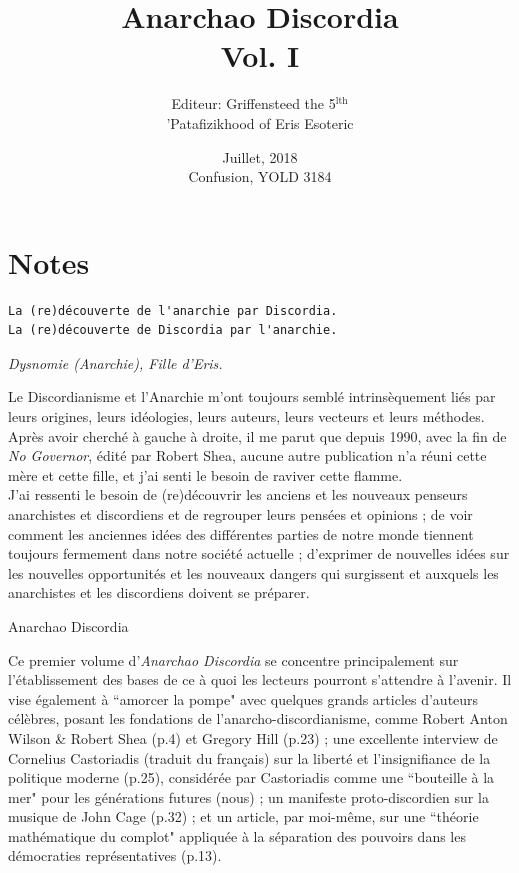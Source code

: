 \documentclass[12pt, onecolumn, letterpaper, oneside]{book}
\title{Anarchao Discordia\\
		\vspace{1\baselineskip}
		\large{Vol. I}
		}
\date{Juillet, 2018\\
		 Confusion, YOLD 3184}
\author{Editeur: Griffensteed the 5$^\text{lth}$\\
			'Patafizikhood of Eris Esoteric\\}
\begin{document}
\sloppy
 \renewcommand{\contentsname}{Sommaire}

\maketitle

\tableofcontents

\chapter*{Notes}
\begin{verbatim}
La (re)découverte de l'anarchie par Discordia.
La (re)découverte de Discordia par l'anarchie.        
\end{verbatim}

\begin{center}
\emph{Dysnomie (Anarchie), Fille d'Eris.}\\
\end{center}

Le Discordianisme et l'Anarchie m'ont toujours semblé intrinsèquement liés par leurs origines, leurs idéologies, leurs auteurs, leurs vecteurs et leurs méthodes. Après avoir cherché à gauche à droite, il me parut que depuis 1990, avec la fin de \emph{No Governor}, édité par Robert Shea, aucune autre publication n'a réuni cette mère et cette fille, et j'ai senti le besoin de raviver cette flamme.\\
J'ai ressenti le besoin de (re)découvrir les anciens et les nouveaux penseurs anarchistes et discordiens et de regrouper leurs pensées et opinions ; de voir comment les anciennes idées des différentes parties de notre monde tiennent toujours fermement dans notre société actuelle ; d'exprimer de nouvelles idées sur les nouvelles opportunités et les nouveaux dangers qui surgissent et auxquels les anarchistes et les discordiens doivent se préparer.\\

\begin{center}
Anarchao Discordia\\
\end{center}

Ce premier volume d'\emph{Anarchao Discordia} se concentre principalement sur l'établissement des bases de ce à quoi les lecteurs pourront s'attendre à l'avenir. Il vise également à ``amorcer la pompe" avec quelques grands articles d'auteurs célèbres, posant les fondations de l'anarcho-discordianisme, comme Robert Anton Wilson \& Robert Shea (p.4) et Gregory Hill (p.23) ; une excellente interview de Cornelius Castoriadis (traduit du français) sur la liberté et l'insignifiance de la politique moderne (p.25), considérée par Castoriadis comme une ``bouteille à la mer" pour les générations futures (nous) ; un manifeste proto-discordien sur la musique de John Cage (p.32) ; et un article, par moi-même, sur une ``théorie mathématique du complot" appliquée à la séparation des pouvoirs dans les démocraties représentatives (p.13).\\
\end{document}
